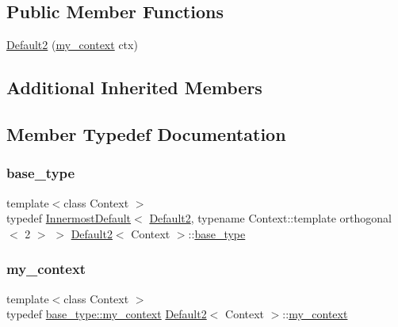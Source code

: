 \subsection*{Public Member Functions}
\begin{DoxyCompactItemize}
\item 
\mbox{\hyperlink{struct_default2_a3ef5327652833780889d9ed543115e75}{Default2}} (\mbox{\hyperlink{struct_default2_aa57309f1d125010ae36dd0793bc35535}{my\+\_\+context}} ctx)
\end{DoxyCompactItemize}
\subsection*{Additional Inherited Members}


\subsection{Member Typedef Documentation}
\mbox{\label{struct_default2_aae469ef4a6b1376464a07533dcf665c7}} 
\subsubsection{\texorpdfstring{base\+\_\+type}{base\_type}}
{\footnotesize\ttfamily template$<$class Context $>$ \\
typedef \mbox{\hyperlink{struct_innermost_default}{Innermost\+Default}}$<$ \mbox{\hyperlink{struct_default2}{Default2}}, typename Context\+::template orthogonal$<$ 2 $>$ $>$ \mbox{\hyperlink{struct_default2}{Default2}}$<$ Context $>$\+::\mbox{\hyperlink{struct_default2_aae469ef4a6b1376464a07533dcf665c7}{base\+\_\+type}}}

\mbox{\label{struct_default2_aa57309f1d125010ae36dd0793bc35535}} 
\subsubsection{\texorpdfstring{my\+\_\+context}{my\_context}}
{\footnotesize\ttfamily template$<$class Context $>$ \\
typedef \mbox{\hyperlink{struct_innermost_default_a0aab337364dec3101e80f293b709d53d}{base\+\_\+type\+::my\+\_\+context}} \mbox{\hyperlink{struct_default2}{Default2}}$<$ Context $>$\+::\mbox{\hyperlink{struct_default2_aa57309f1d125010ae36dd0793bc35535}{my\+\_\+context}}}




